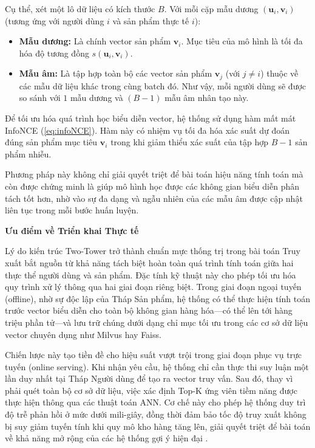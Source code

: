 Cụ thể, xét một lô dữ liệu có kích thước $B$. Với mỗi cặp mẫu dương $(\mathbf{u}_i, \mathbf{v}_i)$ (tương ứng với người dùng $i$ và sản phẩm thực tế $i$):
\begin{itemize}
    \item \textbf{Mẫu dương:} Là chính vector sản phẩm $\mathbf{v}_i$. Mục tiêu của mô hình là tối đa hóa độ tương đồng $s(\mathbf{u}_i, \mathbf{v}_i)$.
    \item \textbf{Mẫu âm:} Là tập hợp toàn bộ các vector sản phẩm $\mathbf{v}_j$ (với $j \neq i$) thuộc về các mẫu dữ liệu khác trong cùng batch đó. Như vậy, mỗi người dùng sẽ được so sánh với $1$ mẫu dương và $(B-1)$ mẫu âm nhân tạo này.
\end{itemize}

Để tối ưu hóa quá trình học biểu diễn vector, hệ thống sử dụng hàm mất mát InfoNCE (\ref{eq:infoNCE}). Hàm này có nhiệm vụ tối đa hóa xác suất dự đoán đúng sản phẩm mục tiêu $\mathbf{v}_i$ trong khi giảm thiểu xác suất của tập hợp $B-1$ sản phẩm nhiễu.

Phương pháp này không chỉ giải quyết triệt để bài toán hiệu năng tính toán mà còn được chứng minh là giúp mô hình học được các không gian biểu diễn phân tách tốt hơn, nhờ vào sự đa dạng và ngẫu nhiên của các mẫu âm được cập nhật liên tục trong mỗi bước huấn luyện.

\vspace{0.3cm}

\noindent \textbf{Ưu điểm về Triển khai Thực tế}

Lý do kiến trúc Two-Tower trở thành chuẩn mực thống trị trong bài toán Truy xuất bắt nguồn từ khả năng tách biệt hoàn toàn quá trình tính toán giữa hai thực thể người dùng và sản phẩm. Đặc tính kỹ thuật này cho phép tối ưu hóa quy trình xử lý thông qua hai giai đoạn riêng biệt. Trong giai đoạn ngoại tuyến (offline), nhờ sự độc lập của Tháp Sản phẩm, hệ thống có thể thực hiện tính toán trước vector biểu diễn cho toàn bộ không gian hàng hóa—có thể lên tới hàng triệu phần tử—và lưu trữ chúng dưới dạng chỉ mục tối ưu trong các cơ sở dữ liệu vector chuyên dụng như Milvus hay Faiss.

Chiến lược này tạo tiền đề cho hiệu suất vượt trội trong giai đoạn phục vụ trực tuyến (online serving). Khi nhận yêu cầu, hệ thống chỉ cần thực thi suy luận một lần duy nhất tại Tháp Người dùng để tạo ra vector truy vấn. Sau đó, thay vì phải quét toàn bộ cơ sở dữ liệu, việc xác định Top-K ứng viên tiềm năng được thực hiện thông qua các thuật toán ANN. Cơ chế này cho phép hệ thống duy trì độ trễ phản hồi ở mức dưới mili-giây, đồng thời đảm bảo tốc độ truy xuất không bị suy giảm tuyến tính khi quy mô kho hàng tăng lên, giải quyết triệt để bài toán về khả năng mở rộng của các hệ thống gợi ý hiện đại \cite{9}.

